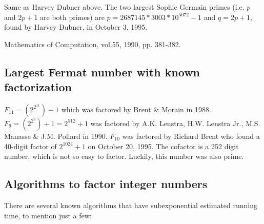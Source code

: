 %

Same as Harvey Dubner above.  The two largest Sophie Germain primes
(i.e. $p$ and $2p+1$ are both primes) are $p=2687145 * 3003 * 10^{5072}
- 1$ and $q=2p + 1$, found by Harvey Dubner, in October 3, 1995.


\Ref

  { Mathematics of
  Computation,}{ vol.55, 1990, pp. 381-382. }


\subsection{Largest Fermat number with known factorization}

$F_{11} = (2^{2^{11}}) + 1$ which was factored by Brent \& Morain in
1988. $F_9 = (2^{2^9}) + 1 = 2^{512} + 1$ was factored by A.K. Lenstra,
H.W. Lenstra Jr., M.S. Manasse \& J.M. Pollard in
1990. %
$F_{10}$ was factored by Richard Brent who found a 40-digit factor of
$2^{1024} + 1$ on October 20, 1995. The cofactor is a 252 digit number,
which is not so easy to factor. Luckily, this number was also prime.

\subsection{Algorithms to factor integer numbers}

There are several known algorithms that have subexponential estimated
running time, to mention just a few:

